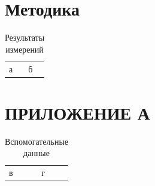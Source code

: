 \section{Методика}

\begin{table}
  \caption{Результаты измерений}
  \begin{tabular}{ll}
    а & б \\
  \end{tabular}
\end{table}

\section*{ПРИЛОЖЕНИЕ А}

\begin{table} %
  \caption{Вспомогательные данные}
  \begin{tabular}{ll}
    в & г \\
  \end{tabular}
\end{table}
